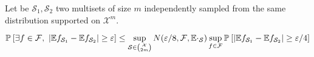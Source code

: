 \begin{lemma}
	Let be $\mathcal{S}_1, \mathcal{S}_2$ two multisets of size $m$ independently sampled from the same distribution supported on $\mathcal{X}^m$. 
	

	\begin{equation}
		\PPP{}{\exists f \in \mathcal{F},\ \lvert \EE{f_{\mathcal{S}_1}} - \EE{f_{\mathcal{S}_2}} \rvert \geq \epsilon} \leq \sup_{\mathcal{S} \in \binom{\mathcal{X}}{2m} } N(\epsilon/8, \mathcal{F}, \EE \cdot_{\mathcal{S}}) \sup_{f \in \mathcal{F}} \PPP{}{\lvert \EE{f_{\mathcal{S}_1}} - \EE{f_{\mathcal{S}_2}} \rvert \geq \epsilon/4 }
	\end{equation}

\end{lemma}


